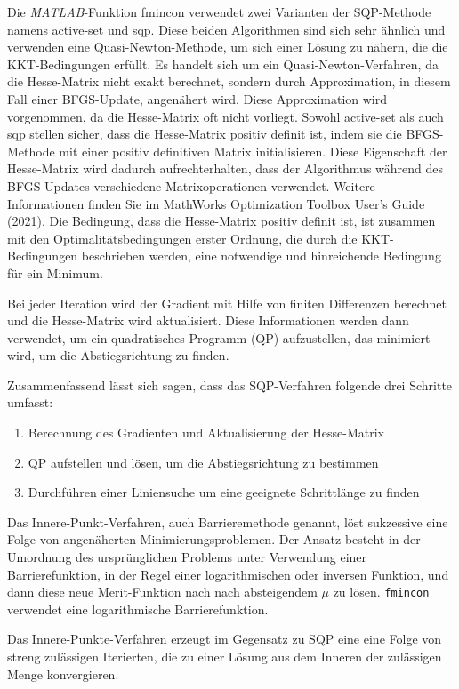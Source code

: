 Die \textit{MATLAB}-Funktion fmincon verwendet zwei Varianten der SQP-Methode namens active-set und sqp. Diese beiden Algorithmen sind sich sehr ähnlich und verwenden eine Quasi-Newton-Methode, um sich einer Lösung zu nähern, die die KKT-Bedingungen erfüllt. Es handelt sich um ein Quasi-Newton-Verfahren, da die Hesse-Matrix nicht exakt berechnet, sondern durch Approximation, in diesem Fall einer BFGS-Update, angenähert wird. Diese Approximation wird vorgenommen, da die Hesse-Matrix oft nicht vorliegt. Sowohl active-set als auch sqp stellen sicher, dass die Hesse-Matrix positiv definit ist, indem sie die BFGS-Methode mit einer positiv definitiven Matrix initialisieren. Diese Eigenschaft der Hesse-Matrix wird dadurch aufrechterhalten, dass der Algorithmus während des BFGS-Updates verschiedene Matrixoperationen verwendet. Weitere Informationen finden Sie im MathWorks Optimization Toolbox User's Guide (2021). Die Bedingung, dass die Hesse-Matrix positiv definit ist, ist zusammen mit den Optimalitätsbedingungen erster Ordnung, die durch die KKT-Bedingungen beschrieben werden, eine notwendige und hinreichende Bedingung für ein Minimum. 

Bei jeder Iteration wird der Gradient mit Hilfe von finiten Differenzen berechnet und die Hesse-Matrix wird aktualisiert. Diese Informationen werden dann verwendet, um ein quadratisches Programm (QP) aufzustellen, das minimiert wird, um die Abstiegsrichtung zu finden.

Zusammenfassend lässt sich sagen, dass das SQP-Verfahren folgende drei Schritte umfasst:
\begin{enumerate}
\item Berechnung des Gradienten und Aktualisierung der Hesse-Matrix
%
\item QP aufstellen und lösen, um die Abstiegsrichtung zu bestimmen
%
\item Durchführen einer Liniensuche um eine geeignete Schrittlänge zu finden
\end{enumerate}

Das Innere-Punkt-Verfahren, auch Barrieremethode genannt, löst sukzessive eine Folge von angenäherten Minimierungsproblemen. Der Ansatz besteht in der Umordnung des ursprünglichen Problems unter Verwendung einer Barrierefunktion, in der Regel einer logarithmischen oder inversen Funktion, und dann diese neue Merit-Funktion nach nach absteigendem $\mu$ zu lösen. \texttt{fmincon} verwendet eine logarithmische Barrierefunktion.

Das Innere-Punkte-Verfahren erzeugt im Gegensatz zu SQP eine eine Folge von streng zulässigen Iterierten, die zu einer Lösung aus dem Inneren der zulässigen Menge konvergieren.

